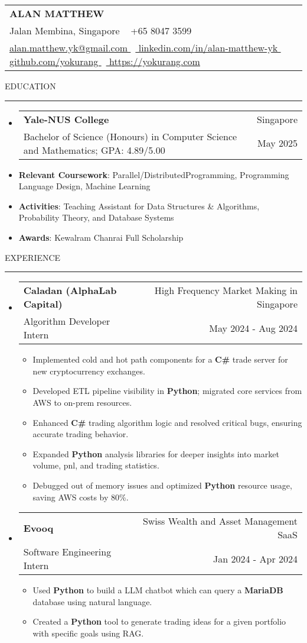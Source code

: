 \documentclass[letterpaper, 11pt]{article}
\makeatletter
\def\sectionlineskip{\medskip}
\def\sectionskip{\medskip}
\def\namesize{\LARGE}
\newcommand{\ResumeHeader}[6]{
  \noindent
  \begin{tabularx}{\textwidth}{>{\centering\arraybackslash}X}
    \namesize\MakeUppercase{\textbf{\fullname}} \\
    #1 \textbar\ #2 \\
    #3 \textbar\ #4 \textbar\ #5 \textbar\ #6 \\
  \end{tabularx}
}
\def \fullname { Alan Matthew }
\def \linkedinlink { https://www.linkedin.com/in/alan-matthew-yk }
\def \linkedintext { linkedin.com/in/alan-matthew-yk }
\def \phonenumber { +65 8047 3599 }
\def \githublink { https://github.com/yokurang }
\def \githubtext { github.com/yokurang }
\def \emaillink { mailto:alan.matthew.yk@gmail.com }
\def \emailtext { alan.matthew.yk@gmail.com }
\def \websitelink { https://yokurang-com.vercel.app/ }
\def \websitetext { https://yokurang.com }
\def \address { 9 Jalan Membina, Singapore }
\def \headertype {\ResumeHeader}
\def \linkedin {\href{\linkedinlink}{\linkedintext}}
\def \phone {{\phonenumber}}
\def \email {\href{\emaillink}{\emailtext}}
\def \github {\href{\githublink}{\githubtext}}
\def \website {\href{\websitelink}{\websitetext}}
\newcommand{\SectionHeading}[1]{
  \sectionskip
  \raggedright\raggedbottom\MakeUppercase{\large{#1}}
  \sectionlineskip
  \hrule
  \color{black}
}
\newcommand{\ResumeEntryTSDL}[4]{
  \vspace{1pt}\item
    \begin{tabular*}{\textwidth}[t]{l@{\extracolsep{\fill}}r} 
      \textbf{#1} & #2 \\
      #3 & #4 \\
    \end{tabular*}\vspace{-2.835pt} %
}
\newcommand{\ResumeItem}[2]{
  \item{
    \textbf{#1}{: #2 \vspace{-2.835pt}}
  }
}
\newcommand{\ResumeItemDefault}[1]{
  \item{
    #1 \vspace{-2.835pt}
  }
}
\newcommand{\ResumeSubItem}[2]{\ResumeItem{#1}{#2}\vspace{-2.835pt}}
\newcommand{\ResumeEntryStart}{\begin{itemize}[leftmargin=0mm, label={}]}
\newcommand{\ResumeEntryEnd}{\end{itemize}\vspace{-2.835pt}} %
\newcommand{\ResumeItemListStart}{\begin{itemize}[leftmargin=5mm, label=$\bullet$, itemsep=1mm, parsep=1mm]} %
\newcommand{\ResumeItemListEnd}{\end{itemize}}
\makeatother
\begin{document}
  \headertype{\address}{\phone}{\email}{\linkedin}{\github}{\website}
  
  \SectionHeading{Education}
  \ResumeEntryStart
    \ResumeEntryTSDL{Yale-NUS College} {Singapore}
    {Bachelor of Science (Honours) in Computer Science and Mathematics; GPA: 4.89/5.00} {May 2025}
    \ResumeSubItem{Relevant Coursework}{Parallel/DistributedProgramming, Programming Language Design, Machine Learning}
    \ResumeSubItem{Activities}{Teaching Assistant for Data Structures \& Algorithms, Probability Theory, and Database Systems}
    \ResumeSubItem{Awards}{Kewalram Chanrai Full Scholarship}
  \ResumeEntryEnd

  \vspace{5pt}

  \SectionHeading{Experience}

  \ResumeEntryStart
  \ResumeEntryTSDL{Caladan (AlphaLab Capital)}{High Frequency Market Making in Singapore}{Algorithm Developer Intern}{May 2024 - Aug 2024}
  \ResumeItemListStart
  \ResumeItemDefault{Implemented cold and hot path components for a \textbf{C\#} trade server for new cryptocurrency exchanges.}
  \ResumeItemDefault{Developed ETL pipeline visibility in \textbf{Python}; migrated core services from AWS to on-prem resources.}
  \ResumeItemDefault{Enhanced \textbf{C\#} trading algorithm logic and resolved critical bugs, ensuring accurate trading behavior.}
  \ResumeItemDefault{Expanded \textbf{Python} analysis libraries for deeper insights into market volume, pnl, and trading statistics.}
  \ResumeItemDefault{Debugged out of memory issues and optimized \textbf{Python} resource usage, saving AWS costs by 80\%.}
  \ResumeItemListEnd
  \ResumeEntryEnd

  \ResumeEntryStart
    \ResumeEntryTSDL{Evooq}{Swiss Wealth and Asset Management SaaS}{Software Engineering Intern}{Jan 2024 - Apr 2024}
    \ResumeItemListStart
    \ResumeItemDefault{Used \textbf{Python} to build a LLM chatbot which can query a \textbf{MariaDB} database using natural language.}
    \ResumeItemDefault{Created a \textbf{Python} tool to generate trading ideas for a given portfolio with specific goals using RAG.}
    \ResumeItemListEnd
  \ResumeEntryEnd
\end{document}
